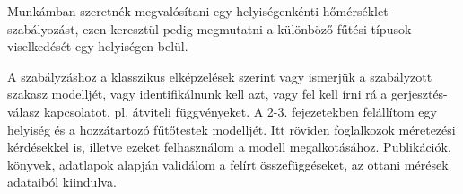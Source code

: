 



Munkámban szeretnék megvalósítani egy helyiségenkénti hőmérséklet-szabályozást, ezen keresztül pedig megmutatni a különböző fűtési típusok viselkedését egy helyiségen belül.


A szabályzáshoz a klasszikus elképzelések szerint vagy ismerjük a szabályzott szakasz modelljét, vagy identifikálnunk kell azt, vagy fel kell írni rá a gerjesztés-válasz kapcsolatot, pl. átviteli függvényeket. 
%
A 2-3. fejezetekben felállítom egy helyiség és a hozzátartozó fűtőtestek modelljét. Itt röviden foglalkozok méretezési kérdésekkel is, illetve ezeket felhasználom a modell megalkotásához. Publikációk, könyvek, adatlapok alapján validálom a felírt összefüggéseket, az ottani mérések adataiból kiindulva. 


%
%
%




